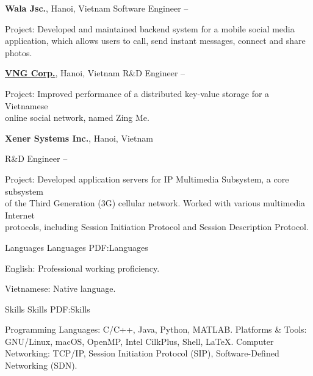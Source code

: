 \documentclass[letterpaper,MMMyyyy,nonstopmode]{simpleresumecv}
\begin{document}
\begin{Body}
\Entry
{\textbf{Wala Jsc.}}, Hanoi, Vietnam
\Gap
\BulletItem
Software Engineer
\hfill
{} -- 
\begin{Detail}
\SubBulletItem
Project: Developed and maintained backend system for a mobile social media \\
application, which allows users to call, send instant messages, connect and share photos. 
\end{Detail}

\BigGap
\Entry
\href{https://www.vng.com.vn/en/index.html}
{\textbf{VNG Corp.}}, Hanoi, Vietnam
\Gap
\BulletItem
R\&D Engineer
\hfill
{} -- 
\begin{Detail}
\SubBulletItem
Project: Improved performance of a distributed key-value storage for a Vietnamese \\
online social network, named Zing Me. 
\end{Detail}

\BigGap
\Entry
{\textbf{Xener Systems Inc.}}, Hanoi, Vietnam

\Gap
\BulletItem
R\&D Engineer
\hfill
{} -- 
\begin{Detail}
\SubBulletItem
Project: Developed application servers for IP Multimedia Subsystem, a core subsystem \\
of the Third Generation (3G) cellular network. Worked with various multimedia Internet \\
protocols, including Session Initiation Protocol and Session Description Protocol. 
\end{Detail}


\Section
{Languages}
{Languages}
{PDF:Languages}

\BulletItem
English: Professional working proficiency.

\Gap
\BulletItem
Vietnamese: Native language.



\Section
{Skills}
{Skills}
{PDF:Skills}

\Entry
\BulletItem
Programming Languages: C/C++, Java, Python, MATLAB.
\BulletItem
Platforms \& Tools: GNU/Linux, macOS, OpenMP, Intel CilkPlus, Shell, {\LaTeX}.
\BulletItem
Computer Networking: TCP/IP, Session Initiation Protocol (SIP), 
Software-Defined Networking (SDN).


\end{Body}
\end{document}
